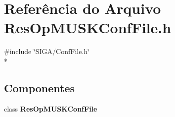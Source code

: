 \section{Referência do Arquivo Res\+Op\+M\+U\+S\+K\+Conf\+File.\+h}
\label{_res_op_m_u_s_k_conf_file_8h}
{\ttfamily \#include \char`\"{}S\+I\+G\+A/\+Conf\+File.\+h\char`\"{}}\\*
\subsection*{Componentes}
\begin{DoxyCompactItemize}
\item 
class {\bf Res\+Op\+M\+U\+S\+K\+Conf\+File}
\end{DoxyCompactItemize}

